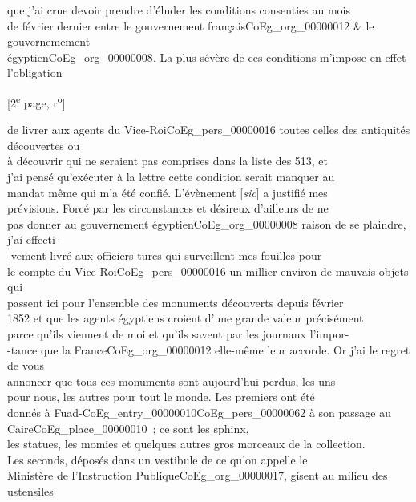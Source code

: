 \documentclass{book}
\begin{document}
que j’ai crue devoir prendre d’éluder les conditions consenties au mois\\
de février dernier entre le gouvernement français\gls{CoEg_org_00000012} \& le gouvernemement\\
égyptien\gls{CoEg_org_00000008}. La plus sévère de ces conditions m’impose en effet l’obligation
{\footnotesize\begin{center} {[2\textsuperscript{e} page, r\textsuperscript{o}]}\end{center}}
\noindent de livrer aux agents du Vice-Roi\gls{CoEg_pers_00000016} toutes celles des antiquités découvertes ou\\
à découvrir qui ne seraient pas comprises dans la liste des 513, et\\
j’ai pensé qu’exécuter à la lettre cette condition serait manquer au\\
mandat même qui m’a été confié. L’évènement {[\textit{sic}]} a justifié mes\\
prévisions. Forcé par les circonstances et désireux d’ailleurs de ne\\
pas donner au gouvernement égyptien\gls{CoEg_org_00000008} raison de se plaindre, j’ai effecti-\\
-vement livré aux officiers turcs qui surveillent mes fouilles pour\\
le compte du Vice-Roi\gls{CoEg_pers_00000016} un millier environ de mauvais objets qui\\
passent ici pour l’ensemble des monuments découverts depuis février\\
1852 et que les agents égyptiens croient d’une grande valeur précisément\\
parce qu’ils viennent de moi et qu’ils savent par les journaux l’impor-\\
-tance que la France\gls{CoEg_org_00000012} elle-même leur accorde. Or j’ai le regret de vous\\
annoncer que tous ces monuments sont aujourd’hui perdus, les uns\\
pour nous, les autres pour tout le monde. Les premiers ont été\\
donnés à Fuad-\gls{CoEg_entry_00000010}\gls{CoEg_pers_00000062} à son passage au Caire\gls{CoEg_place_00000010}~; ce sont les sphinx,\\
les statues, les momies et quelques autres gros morceaux de la collection.\\
Les seconds, déposés dans un vestibule de ce qu’on appelle le\\
Ministère de l’Instruction Publique\gls{CoEg_org_00000017}, gisent au milieu des ustensiles\\
\end{document}
